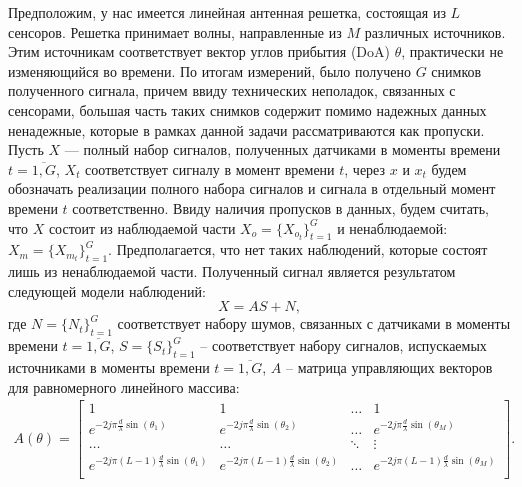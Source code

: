 \documentclass[11pt]{article}
\begin{document}
\begin{center}
\fontsize{20}{23}\selectfont {}
\end{center}
\begin{center}
\fontsize{16}{20}\selectfont {}
\end{center}
Предположим, у нас имеется линейная антенная решетка, состоящая из $L$ сенсоров. Решетка принимает волны, направленные из $M$ различных источников. Этим источникам соответствует вектор углов прибытия (DoA) $\theta$, практически не изменяющийся во времени. По итогам измерений, было получено $G$ снимков полученного сигнала, причем ввиду технических неполадок, связанных с сенсорами, большая часть таких снимков содержит помимо надежных данных ненадежные, которые в рамках данной задачи рассматриваются как пропуски. Пусть $X$ --- полный набор сигналов, полученных датчиками в моменты времени $t=\overline{1,G}$, $X_t$ соответствует сигналу в момент времени $t$, через $x$ и $x_t$ будем обозначать реализации полного набора сигналов и сигнала в отдельный момент времени $t$  соответственно. Ввиду наличия пропусков в данных, будем считать, что $X$ состоит из наблюдаемой части $X_o = \{X_{o_t}\}_{t=1}^G$ и ненаблюдаемой: $X_m = \{X_{m_t}\}_{t=1}^G$. Предполагается, что нет таких наблюдений, которые состоят лишь из ненаблюдаемой части. Полученный сигнал является результатом следующей модели наблюдений:
\begin{equation}
X = A S + N,
\end{equation}
где $N=\{N_t\}_{t=1}^G$ соответствует набору шумов, связанных с датчиками в моменты времени $t=\overline{1,G}$, $S=\{S_t\}_{t=1}^G$ -- соответствует набору сигналов, испускаемых источниками в моменты времени $t=\overline{1,G}$, $A$ -- матрица управляющих векторов для равномерного линейного массива:
\begin{gather}
A(\theta) = \begin{bmatrix}
1&1&\dots&1\\
e^{-2j\pi \frac{d}{\lambda}\sin(\theta_1)}& e^{-2j\pi \frac{d}{\lambda}\sin(\theta_2)}&\dots&e^{-2j\pi \frac{d}{\lambda}\sin(\theta_M)}\\
\dots&\dots&\ddots&\vdots\\
e^{-2j\pi (L-1) \frac{d}{\lambda}\sin(\theta_1)}& e^{-2j\pi (L-1) \frac{d}{\lambda}\sin(\theta_2)}&\dots&e^{-2j\pi (L-1) \frac{d}{\lambda}\sin(\theta_M)}\\
\end{bmatrix}.
\nonumber
\end{gather}
\end{document}
